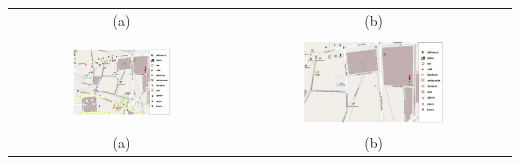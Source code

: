 \begin{center}
\begin{tabular}{c c}
(a) & (b) \\
& \\
\includegraphics[width=0.46\textwidth]{images/corpus/mapa5.png} & \includegraphics[width=0.53\textwidth]{images/corpus/mapa15.png} \\
(a) & (b) \\
\end{tabular}
\end{center}

